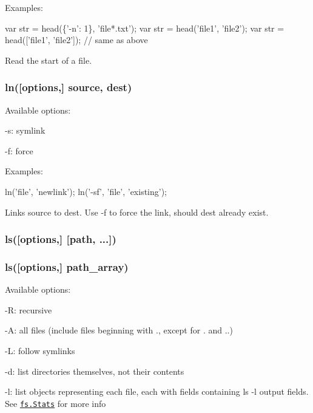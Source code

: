 Examples\+:


\begin{DoxyCode}
var str = head(\{'-n': 1\}, 'file*.txt');
var str = head('file1', 'file2');
var str = head(['file1', 'file2']); // same as above
\end{DoxyCode}


Read the start of a file.

\subsubsection*{ln(\mbox{[}options,\mbox{]} source, dest)}

Available options\+:


\begin{DoxyItemize}
\item {\ttfamily -\/s}\+: symlink
\item {\ttfamily -\/f}\+: force
\end{DoxyItemize}

Examples\+:


\begin{DoxyCode}
ln('file', 'newlink');
ln('-sf', 'file', 'existing');
\end{DoxyCode}


Links source to dest. Use -\/f to force the link, should dest already exist.

\subsubsection*{ls(\mbox{[}options,\mbox{]} \mbox{[}path, ...\mbox{]})}

\subsubsection*{ls(\mbox{[}options,\mbox{]} path\+\_\+array)}

Available options\+:


\begin{DoxyItemize}
\item {\ttfamily -\/R}\+: recursive
\item {\ttfamily -\/A}\+: all files (include files beginning with {\ttfamily .}, except for {\ttfamily .} and {\ttfamily ..})
\item {\ttfamily -\/L}\+: follow symlinks
\item {\ttfamily -\/d}\+: list directories themselves, not their contents
\item {\ttfamily -\/l}\+: list objects representing each file, each with fields containing {\ttfamily ls -\/l} output fields. See \href{https://nodejs.org/api/fs.html#fs_class_fs_stats}{\tt fs.\+Stats} for more info
\end{DoxyItemize}

